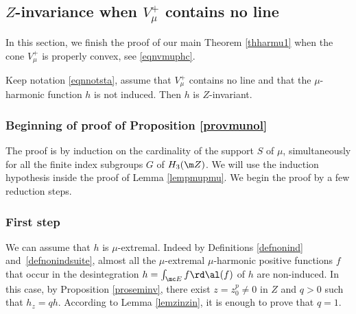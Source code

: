 \subsection{$Z$-invariance when $V^+_\mu$ contains no line}
\label{secvmunol}

\bq
In this section, we finish the proof of our main Theorem
\ref{thharmu1}
when the cone $V_\mu^+$ is properly convex, see \eqref{eqnvmuphc}.
\eq

\begin{Prop}

\label{provmunol}
Keep notation \eqref{eqnnotsta}, assume that
$V^+_\mu$ contains no line
and that the $\mu$-harmonic function $h$ is not induced.
Then $h$ is $Z$-invariant.
\end{Prop}

\subsubsection*{Beginning of proof of Proposition \ref{provmunol}}
The proof is by induction on the cardinality of the support $S$ of $\mu$,
simultaneously for all the finite index subgroups $G$ of $H_3(\m Z)$.
We will use the induction hypothesis inside the proof of Lemma \ref{lempmupmu}. We begin the proof by a few reduction steps.

\subsubsection*{First step}
We can assume that $h$ is $\mu$-extremal.
Indeed by Definitions \ref{defnonind} and~\ref{defnonindsuite},
almost all the $\mu$-extremal $\mu$-harmonic positive functions $f$
that occur in the desintegration $h=\int_{\mc E}f\rd \al (f)$ of $h$
are non-induced.
In this case,
by Proposition \ref{proseminv}, there exist $z=z_0^p\neq 0$ in $Z$ and $q>0$
such that $h_z=qh$.
According to Lemma \ref{lemzinzin}, it is enough to prove that $q=1$.

